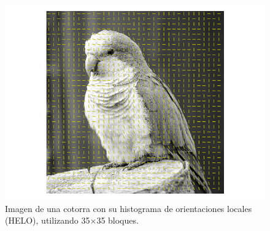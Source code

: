 \documentclass[conference]{IEEEtran}
\begin{document}
	\begin{figure}[H]
    \centering
    \includegraphics[width=0.95\linewidth]{image/birb_helo.png}
\caption{Imagen de una cotorra con su histograma de orientaciones locales (HELO), utilizando 35$\times$35 bloques.}
\end{figure}	
	
\end{document}
